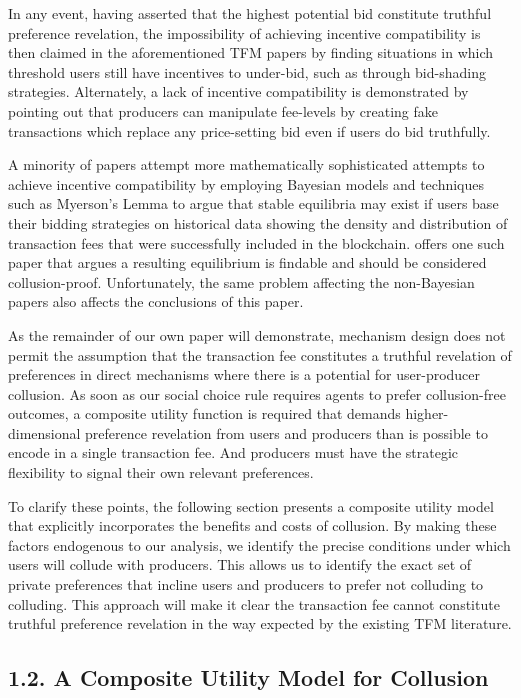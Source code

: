 \documentclass[oneside]{article}   	%
\begin{document}
In any event, having asserted that the highest potential bid constitute truthful preference revelation, the impossibility of achieving incentive compatibility is then claimed in the aforementioned TFM papers by finding situations in which threshold users still have incentives to under-bid, such as through bid-shading strategies. Alternately, a lack of incentive compatibility is demonstrated by pointing out that producers can manipulate fee-levels by creating fake transactions which replace any price-setting bid even if users do bid truthfully.

A minority of papers attempt more mathematically sophisticated attempts to achieve incentive compatibility by employing Bayesian models and techniques such as Myerson's Lemma to argue that stable equilibria may exist if users base their bidding strategies on historical data showing the density and distribution of transaction fees that were successfully included in the blockchain. \cite{chen2022bayesian} offers one such paper that argues a resulting equilibrium is findable and should be considered collusion-proof. Unfortunately, the same problem affecting the non-Bayesian papers also affects the conclusions of this paper.

As the remainder of our own paper will demonstrate, mechanism design does not permit the assumption that the transaction fee constitutes a truthful revelation of preferences in direct mechanisms where there is a potential for user-producer collusion. As soon as our social choice rule requires agents to prefer collusion-free outcomes, a composite utility function is required that demands higher-dimensional preference revelation from users and producers than is possible to encode in a single transaction fee. And producers must have the strategic flexibility to signal their own relevant preferences.

To clarify these points, the following section presents a composite utility model that explicitly incorporates the benefits and costs of collusion. By making these factors endogenous to our analysis, we identify the precise conditions under which users will collude with producers. This allows us to identify the exact set of private preferences that incline users and producers to prefer not colluding to colluding. This approach will make it clear the transaction fee cannot constitute truthful preference revelation in the way expected by the existing TFM literature.

\subsection*{1.2. A Composite Utility Model for Collusion}
\vspace{0.5em}
\end{document}

